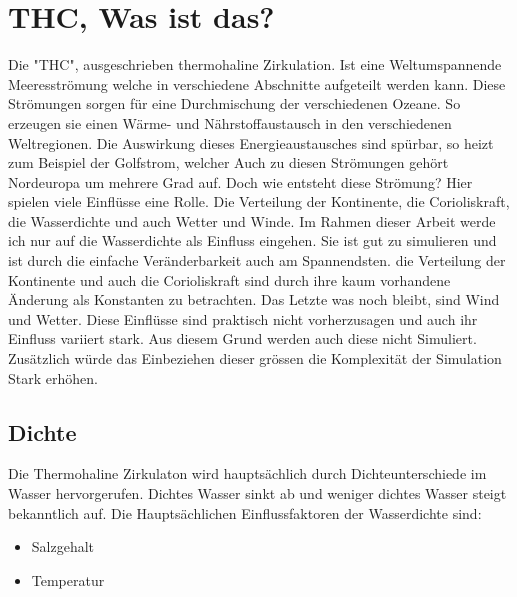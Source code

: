 \section{THC, Was ist das?}

Die "THC", ausgeschrieben thermohaline Zirkulation. Ist eine Weltumspannende Meeresströmung welche in verschiedene Abschnitte aufgeteilt werden kann.
Diese Strömungen sorgen für eine Durchmischung der verschiedenen Ozeane. So erzeugen sie einen Wärme- und Nährstoffaustausch in den verschiedenen Weltregionen. 
Die Auswirkung dieses Energieaustausches sind spürbar, so heizt zum Beispiel der Golfstrom, welcher Auch zu diesen Strömungen gehört Nordeuropa um mehrere Grad auf.
Doch wie entsteht diese Strömung?
Hier spielen viele Einflüsse eine Rolle. Die Verteilung der Kontinente, die Corioliskraft, die Wasserdichte und auch Wetter und Winde. 
Im Rahmen dieser Arbeit werde ich nur auf die Wasserdichte als Einfluss eingehen. Sie ist gut zu simulieren und ist durch die einfache Veränderbarkeit auch am Spannendsten.
die Verteilung der Kontinente und auch die Corioliskraft sind durch ihre kaum vorhandene Änderung als Konstanten zu betrachten. Das Letzte was noch bleibt, sind Wind und Wetter. 
Diese Einflüsse sind praktisch nicht vorherzusagen und auch ihr Einfluss variiert stark. Aus diesem Grund werden auch diese nicht Simuliert. 
Zusätzlich würde das Einbeziehen dieser grössen die Komplexität der Simulation Stark erhöhen.

\subsection{Dichte}

Die Thermohaline Zirkulaton wird hauptsächlich durch Dichteunterschiede im Wasser hervorgerufen.
Dichtes Wasser sinkt ab und weniger dichtes Wasser steigt bekanntlich auf. Die Hauptsächlichen Einflussfaktoren der Wasserdichte sind:

\begin{itemize}
	\item Salzgehalt
	\item Temperatur
\end{itemize}

